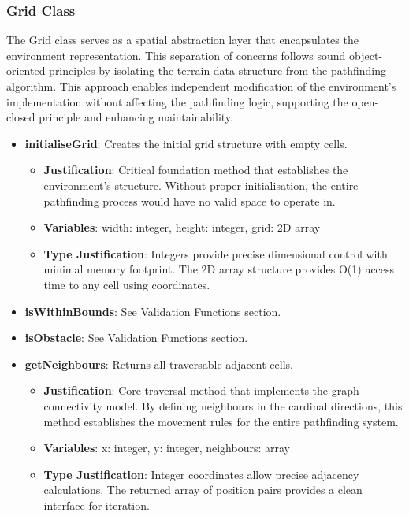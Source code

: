 \newpage


\subsubsection*{Grid Class}
The Grid class serves as a spatial abstraction layer that encapsulates the environment representation. This separation of concerns follows sound object-oriented principles by isolating the terrain data structure from the pathfinding algorithm. This approach enables independent modification of the environment's implementation without affecting the pathfinding logic, supporting the open-closed principle and enhancing maintainability.

\begin{itemize}
  \item \textbf{initialiseGrid}: Creates the initial grid structure with empty cells.
    \begin{itemize}
      \item \textbf{Justification}: Critical foundation method that establishes the environment's structure. Without proper initialisation, the entire pathfinding process would have no valid space to operate in.
      \item \textbf{Variables}: width: integer, height: integer, grid: 2D array
      \item \textbf{Type Justification}: Integers provide precise dimensional control with minimal memory footprint. The 2D array structure provides O(1) access time to any cell using coordinates.
    \end{itemize}
    
  \item \textbf{isWithinBounds}: See Validation Functions section.
  
  \item \textbf{isObstacle}: See Validation Functions section.
  
  \item \textbf{getNeighbours}: Returns all traversable adjacent cells.
    \begin{itemize}
      \item \textbf{Justification}: Core traversal method that implements the graph connectivity model. By defining neighbours in the cardinal directions, this method establishes the movement rules for the entire pathfinding system.
      \item \textbf{Variables}: x: integer, y: integer, neighbours: array
      \item \textbf{Type Justification}: Integer coordinates allow precise adjacency calculations. The returned array of position pairs provides a clean interface for iteration.
    \end{itemize}
  

\end{itemize}
